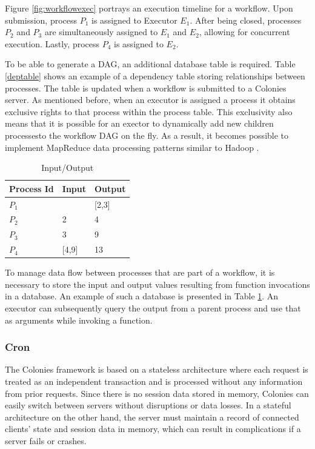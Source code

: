 \documentclass{article}
\begin{document}
Figure \ref{fig:workflowexec} portrays an execution timeline for a workflow. Upon submission, process \(P_{1}\) is assigned to Executor \(E_{1}\). After being closed, processes \(P_{2}\) and \(P_{3}\) are simultaneously assigned to \(E_{1}\) and \(E_{2}\), allowing for concurrent execution. Lastly, process \(P_{4}\) is assigned to \(E_{2}\).  

To be able to generate a DAG, an additional database table is required. Table \ref{deptable} shows an example of a dependency table storing relationships between processes. The table is updated when a workflow is submitted to a Colonies server. As mentioned before, when an executor is assigned a process it obtains exclusive rights to that process within the process table. This exclusivity also means that it is possible for an exector to dynamically add new children processesto  the workflow DAG on the fly. As a result, it becomes possible to implement MapReduce \cite{mapreduce} data processing patterns similar to Hadoop \cite{hadoop}.  

\begin{table}[h]
	\caption{Input/Output}
	\centering
	\begin{tabular}{lll}
		\toprule
		\cmidrule(r){1-2}
        Process Id & Input & Output \\
		\midrule
        $P_{1}$    & & [2,3] \\
        $P_{2}$    & 2 & 4 \\
        $P_{3}$    & 3 & 9 \\
        $P_{4}$    & [4,9] & 13 \\
		\bottomrule
	\end{tabular}
	\label{inouttable}
\end{table}

To manage data flow between processes that are part of a workflow, it is necessary to store the input and output values resulting from function invocations in a database. An example of such a database is presented in Table \ref{inouttable}. An executor can subsequently query the output from a parent process and use that as arguments while invoking a function.

\subsubsection{Cron}
The Colonies framework is based on a stateless architecture where each request is treated as an independent transaction and is processed without any information from prior requests. Since there is no session data stored in memory, Colonies can easily switch between servers without disruptions or data losses. In a stateful architecture on the other hand, the server must maintain a record of connected clients' state and session data in memory, which can result in complications if a server fails or crashes. 
\end{document}
